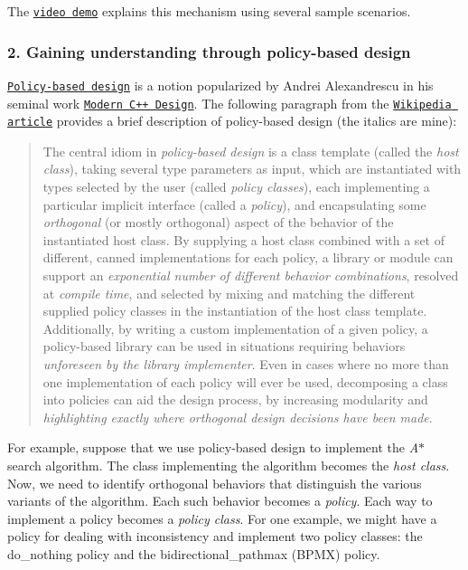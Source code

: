 The \href{https://youtu.be/cElxLWve1Zw}{\tt video demo} explains this mechanism using several sample scenarios.\hypertarget{index_s-policy}{}\subsubsection{2. Gaining understanding through policy-\/based design}\label{index_s-policy}
\href{https://en.wikipedia.org/wiki/Policy-based_design}{\tt Policy-\/based design} is a notion popularized by Andrei Alexandrescu in his seminal work \href{https://en.wikipedia.org/wiki/Modern_C%2B%2B_Design}{\tt Modern C++ Design}. The following paragraph from the \href{https://en.wikipedia.org/wiki/Policy-based_design}{\tt Wikipedia article} provides a brief description of policy-\/based design (the italics are mine)\+: \begin{quote}
The central idiom in {\itshape policy-\/based design} is a class template (called the {\itshape host class}), taking several type parameters as input, which are instantiated with types selected by the user (called {\itshape policy classes}), each implementing a particular implicit interface (called a {\itshape policy}), and encapsulating some {\itshape orthogonal} (or mostly orthogonal) aspect of the behavior of the instantiated host class. By supplying a host class combined with a set of different, canned implementations for each policy, a library or module can support an {\itshape exponential number of different behavior combinations}, resolved at {\itshape compile time}, and selected by mixing and matching the different supplied policy classes in the instantiation of the host class template. Additionally, by writing a custom implementation of a given policy, a policy-\/based library can be used in situations requiring behaviors {\itshape unforeseen by the library implementer}. Even in cases where no more than one implementation of each policy will ever be used, decomposing a class into policies can aid the design process, by increasing modularity and {\itshape highlighting exactly where orthogonal design decisions have been made}. \end{quote}
For example, suppose that we use policy-\/based design to implement the {\itshape A$\ast$} search algorithm. The class implementing the algorithm becomes the {\itshape host class}. Now, we need to identify orthogonal behaviors that distinguish the various variants of the algorithm. Each such behavior becomes a {\itshape policy}. Each way to implement a policy becomes a {\itshape policy class}. For one example, we might have a policy for dealing with inconsistency and implement two policy classes\+: the {\ttfamily do\+\_\+nothing} policy and the {\ttfamily bidirectional\+\_\+pathmax (B\+P\+MX)} policy.

